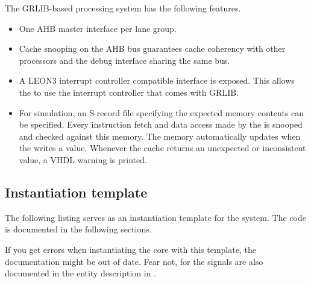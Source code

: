 
\label{sec:rvsysgr}

The \rvex{} GRLIB-based processing system has the following features.

\begin{itemize}

\item One AHB master interface per \rvex{} lane group.

\item Cache snooping on the AHB bus guarantees cache coherency with other
processors and the debug interface sharing the same bus.

\item A LEON3 interrupt controller compatible interface is exposed. This allows
the \rvex{} to use the interrupt controller that comes with GRLIB.

\item For simulation, an S-record file specifying the expected memory contents
can be specified. Every instruction fetch and data access made by the \rvex{} is
snooped and checked against this memory. The memory automatically updates when
the \rvex{} writes a value. Whenever the cache returns an unexpected or
inconsistent value, a VHDL warning is printed.

\end{itemize}

\subsection{Instantiation template}
\label{sec:rvsysgr-inst}

The following listing serves as an instantiation template for the system. The 
code is documented in the following sections.

If you get errors when instantiating the core with this template, the
documentation might be out of date. Fear not, for the signals are also
documented in the entity description in .

